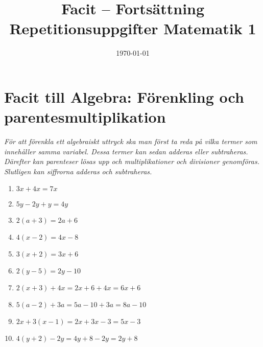 \documentclass[a4paper,11pt]{article}
\title{Facit -- Fortsättning Repetitionsuppgifter Matematik 1}
\author{}
\date{\today}
\begin{document}
\maketitle

\section*{Facit till Algebra: Förenkling och parentesmultiplikation}
\textit{För att förenkla ett algebraiskt uttryck ska man först ta reda på vilka termer som innehåller samma variabel. Dessa termer kan sedan adderas eller subtraheras. Därefter kan parenteser lösas upp och multiplikationer och divisioner genomföras. Slutligen kan siffrorna adderas och subtraheras.}
\begin{enumerate}[label=\textbf{A\arabic*.}]
\item $3x + 4x = 7x$
\item $5y - 2y + y = 4y$
\item $2(a + 3) = 2a + 6$
\item $4(x - 2) = 4x - 8$
\item $3(x + 2) = 3x + 6$
\item $2(y - 5) = 2y - 10$
\item $2(x + 3) + 4x = 2x + 6 + 4x = 6x + 6$
\item $5(a - 2) + 3a = 5a - 10 + 3a = 8a - 10$
\item $2x + 3(x - 1) = 2x + 3x - 3 = 5x - 3$
\item $4(y + 2) - 2y = 4y + 8 - 2y = 2y + 8$
\end{enumerate}
\newpage
\end{document}
